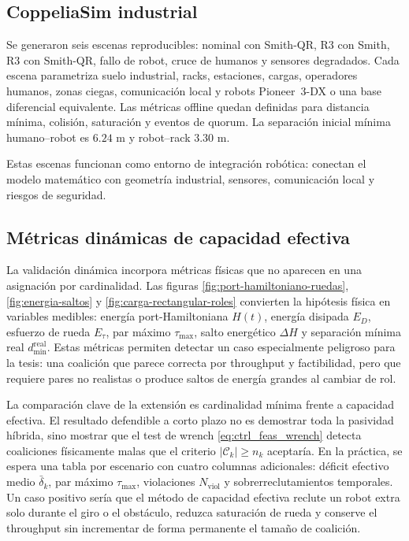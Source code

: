 \subsection{CoppeliaSim industrial}

Se generaron seis escenas reproducibles: nominal con
Smith-QR, R3 con Smith, R3 con Smith-QR, fallo de robot, cruce de humanos y sensores
degradados. Cada escena parametriza suelo industrial, racks, estaciones, cargas,
operadores humanos, zonas ciegas, comunicación local y robots Pioneer~3-DX o una base
diferencial equivalente. Las métricas offline quedan
definidas para distancia mínima, colisión, saturación y eventos de quorum. La separación
inicial mínima humano--robot es $6.24$ m y robot--rack $3.30$ m.

Estas escenas funcionan como entorno de integración robótica: conectan el modelo
matemático con geometría industrial, sensores, comunicación local y riesgos de
seguridad.

\subsection{Métricas dinámicas de capacidad efectiva}

La validación dinámica incorpora métricas físicas que no aparecen en una asignación por
cardinalidad. Las figuras
\ref{fig:port-hamiltoniano-ruedas}, \ref{fig:energia-saltos} y
\ref{fig:carga-rectangular-roles} convierten la hipótesis física en variables
medibles: energía port-Hamiltoniana $H(t)$, energía disipada $E_D$, esfuerzo de rueda
$E_{\tau}$, par máximo $\tau_{\max}$, salto energético $\Delta H$ y separación mínima
real $d_{\min}^{\mathrm{real}}$. Estas métricas permiten detectar un caso especialmente
peligroso para la tesis: una coalición que parece correcta por throughput y factibilidad,
pero que requiere pares no realistas o produce saltos de energía grandes al cambiar de
rol.

La comparación clave de la extensión es cardinalidad mínima frente a capacidad efectiva.
El resultado defendible a corto plazo no es demostrar toda la pasividad híbrida, sino
mostrar que el test de wrench \eqref{eq:ctrl_feas_wrench} detecta coaliciones físicamente
malas que el criterio $|\mathcal C_k|\geq n_k$ aceptaría. En la práctica, se espera una
tabla por escenario con cuatro columnas adicionales: déficit efectivo medio $\bar\delta_k$,
par máximo
$\tau_{\max}$, violaciones $N_{\mathrm{viol}}$ y sobrerreclutamientos temporales. Un
caso positivo sería que el método de capacidad efectiva reclute un robot extra solo
durante el giro o el obstáculo, reduzca saturación de rueda y conserve el throughput sin
incrementar de forma permanente el tamaño de coalición.

